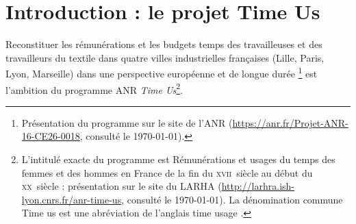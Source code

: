 \section*{Introduction : le projet Time Us}

\og Reconstituer les rémunérations et les budgets temps des travailleuses et des travailleurs du textile dans quatre villes industrielles françaises (Lille, Paris, Lyon, Marseille) dans une perspective européenne et de longue durée \fg{}\footnote{Présentation du programme sur le site de l'ANR (\url{https://anr.fr/Projet-ANR-16-CE26-0018}, consulté le \today).} est l'ambition du programme ANR \textit{Time Us}\footnote{L'intitulé exacte du programme est \og Rémunérations et usages du temps des femmes et des hommes en France de la fin du \textsc{xvii}\ieme ~siècle au début du  \textsc{xx}\ieme ~siècle \fg{} : présentation sur le site du LARHA (\url{http://larhra.ish-lyon.cnrs.fr/anr-time-us}, consulté le \today). La dénomination commune \og Time us \fg{} est une abréviation de l'anglais \og time usage \fg{}.}. 